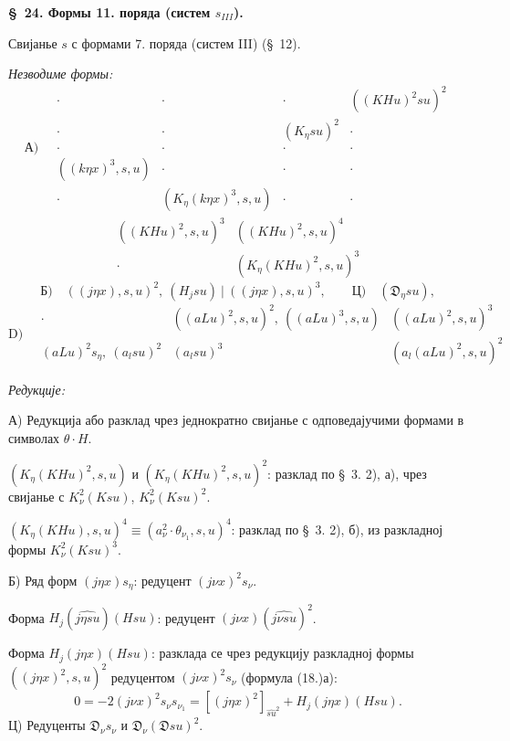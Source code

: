 ﻿\documentclass[11pt]{article}
\newcommand{\D}{\mathfrak D}
\begin{document}
\begin{center}
\textbf{\S\ 24. \quad Формы 11. поряда (систем $s_{III}$).}
\end{center}

Свијанье $s$ с формами 7. поряда (систем III) (\S\ 12).

\noindent\textit{Незводиме формы:}
\[
\text{А)}\quad
\begin{array}{c|c|c|c}
\cdot&\cdot&\cdot&((KHu)^2su)^2\\[0.35em]
\cdot&\cdot&(K_\eta su)^2&\cdot\\[0.35em]
\cdot&\cdot&\cdot&\cdot\\[0.35em]
((k\eta x)^3,s,u)&\cdot&\cdot&\cdot\\[0.35em]
\cdot&(K_\eta(k\eta x)^3,s,u)&\cdot&\cdot
\end{array}
\]
\[
\begin{array}{c|c}
((KHu)^2,s,u)^3&((KHu)^2,s,u)^4\\[0.45em]
\cdot&(K_\eta(KHu)^2,s,u)^3
\end{array}
\]
\[
\text{Б)}\quad ((j\eta x),s,u)^2,\ (H_jsu)\ \big|\ ((j\eta x),s,u)^3,
\qquad \text{Ц)}\quad (\D_\eta su),
\]
\[
\text{D)}\quad
\begin{array}{c|c|c}
\cdot&((aLu)^2,s,u)^2,\ ((aLu)^3,s,u)&((aLu)^2,s,u)^3\\[0.5em]
(aLu)^2s_\eta,\ (a_lsu)^2&(a_lsu)^3&(a_l(aLu)^2,s,u)^2
\end{array}
\]

\noindent\textit{Редукције:}

А) Редукција або разклад чрез једнократно свијанье с одповедајучими формами в символах $\theta\cdot H$.

$(K_\eta(KHu)^2,s,u)$ и $(K_\eta(KHu)^2,s,u)^2$: разклад по \S\ 3. 2), а), чрез свијанье с $K_{\nu}^2(Ksu)$, $K_{\nu}^2(Ksu)^2$.

$(K_\eta(KHu),s,u)^4\equiv(a_{\nu}^2\cdot\theta_{\nu_1},s,u)^4$: разклад по \S\ 3. 2), б), из разкладној формы $K_{\nu}^2(Ksu)^3$.

Б) Ряд форм $(j\eta x)s_\eta$: редуцент $(j\nu x)^2s_{\nu}$.

Форма $H_j(\widehat{j\eta su})(Hsu)$: редуцент $(j\nu x)(\widehat{j\nu su})^2$.

Форма $H_j(j\eta x)(Hsu)$: разклада се чрез редукцију разкладној формы $((j\eta x)^2,s,u)^2$ редуцентом $(j\nu x)^2s_{\nu}$ (формула (18.)а):
\[
0=-2(j\nu x)^2s_{\nu}s_{\nu_1}=[(j\eta x)^2]_{\widehat{su}^2}+H_j(j\eta x)(Hsu).
\]
Ц) Редуценты $\D_{\nu}s_{\nu}$ и $\D_{\nu}(\D su)^2$.
\end{document}
